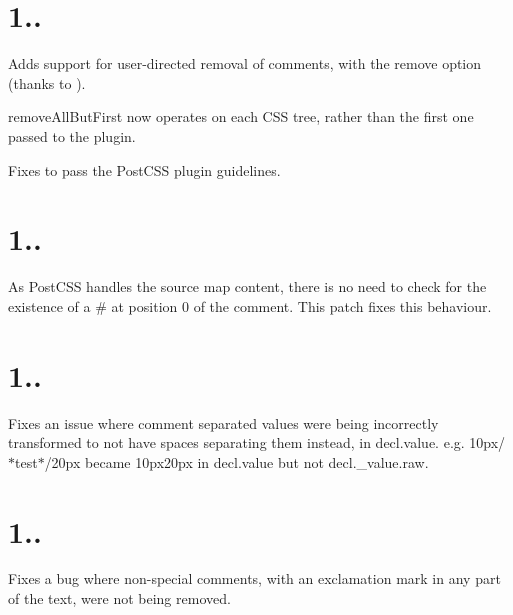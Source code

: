 \section*{1..}


\begin{DoxyItemize}
\item Adds support for user-\/directed removal of comments, with the {\ttfamily remove} option (thanks to ).
\item {\ttfamily remove\+All\+But\+First} now operates on each C\+SS tree, rather than the first one passed to the plugin.
\item Fixes to pass the Post\+C\+SS plugin guidelines.
\end{DoxyItemize}

\section*{1..}


\begin{DoxyItemize}
\item As Post\+C\+SS handles the source map content, there is no need to check for the existence of a \textquotesingle{}\#\textquotesingle{} at position 0 of the comment. This patch fixes this behaviour.
\end{DoxyItemize}

\section*{1..}


\begin{DoxyItemize}
\item Fixes an issue where comment separated values were being incorrectly transformed to not have spaces separating them instead, in {\ttfamily decl.\+value}. e.\+g. {\ttfamily 10px/$\ast$test$\ast$/20px} became {\ttfamily 10px20px} in {\ttfamily decl.\+value} but not {\ttfamily decl.\+\_\+value.\+raw}.
\end{DoxyItemize}

\section*{1..}


\begin{DoxyItemize}
\item Fixes a bug where non-\/special comments, with an exclamation mark in any part of the text, were not being removed.
\end{DoxyItemize}

